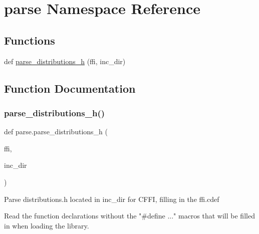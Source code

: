 \hypertarget{namespaceparse}{}\section{parse Namespace Reference}
\label{namespaceparse}
\subsection*{Functions}
\begin{DoxyCompactItemize}
\item 
def \hyperlink{namespaceparse_afe27b870c44f7e3cecc50a600b49861f}{parse\+\_\+distributions\+\_\+h} (ffi, inc\+\_\+dir)
\end{DoxyCompactItemize}


\subsection{Function Documentation}
\mbox{\label{namespaceparse_afe27b870c44f7e3cecc50a600b49861f}} 
\subsubsection{\texorpdfstring{parse\+\_\+distributions\+\_\+h()}{parse\_distributions\_h()}}
{\footnotesize\ttfamily def parse.\+parse\+\_\+distributions\+\_\+h (\begin{DoxyParamCaption}\item[{}]{ffi,  }\item[{}]{inc\+\_\+dir }\end{DoxyParamCaption})}

\begin{DoxyVerb}Parse distributions.h located in inc_dir for CFFI, filling in the ffi.cdef

Read the function declarations without the "#define ..." macros that will
be filled in when loading the library.
\end{DoxyVerb}
 